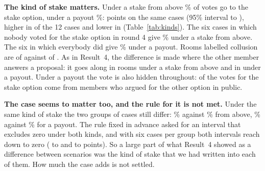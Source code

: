 \documentclass[11pt]{article}
\makeatletter
\renewcommand\section{\@startsection{section}{1}{\z@}{-2.2ex \@plus -.6ex \@minus -.3ex}{1.0ex \@plus .2ex}{\normalfont\large\bfseries}}
\newcommand{\qa}[1]{\par\smallskip\noindent\textbf{#1}\enspace}
\makeatother
\begin{document}
\qa{The kind of stake matters.} Under a stake from above \% of votes go to the stake option, under a payout
\%:  points on the same cases (95\% interval  to ), higher in  of the
12 cases and lower in  (Table~\ref{tab:kinds}). The six cases in which nobody voted for the stake option in
round 4 give \% under a stake from above. The six in which everybody did give \% under a
payout. Rooms labelled collusion are  of  against  of . As in
Result~4, the difference is made where the other member answers a proposal: it goes along in  rooms under
a stake from above and in  under a payout. Under a payout the vote is also hidden throughout:
 of the  votes for the stake option come from members who argued for the other
option in public.

\qa{The case seems to matter too, and the rule for it is not met.} Under the same kind of stake the two groups of
cases still differ: \% against \% from above, \% against
\% for a payout. The rule fixed in advance asked for an interval that excludes zero under both kinds,
and with six cases per group both intervals reach down to zero ( to  and 
to  points). So a large part of what Result~4 showed as a difference between scenarios was the kind of
stake that we had written into each of them. How much the case adds is not settled.

\section{Limits}
\end{document}
